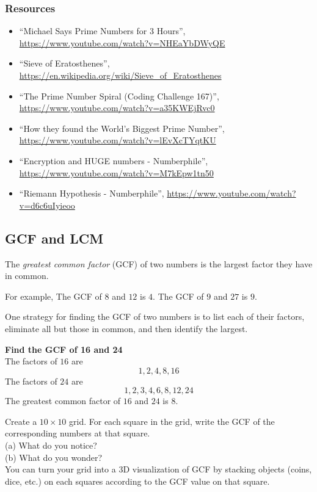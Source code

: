 \subsubsection{Resources}
\begin{itemize}
	\item {\footnotesize ``Michael Says Prime Numbers for 3 Hours'', \url{https://www.youtube.com/watch?v=NHEaYbDWyQE}}
	\item {\footnotesize ``Sieve of Eratosthenes'', \url{https://en.wikipedia.org/wiki/Sieve_of_Eratosthenes}}
	\item {\footnotesize ``The Prime Number Spiral (Coding Challenge 167)'', \url{https://www.youtube.com/watch?v=a35KWEjRvc0}}
	\item {\footnotesize ``How they found the World's Biggest Prime Number'', \url{https://www.youtube.com/watch?v=lEvXcTYqtKU}}
	\item {\footnotesize ``Encryption and HUGE numbers - Numberphile'', \url{https://www.youtube.com/watch?v=M7kEpw1tn50}}
	\item {\footnotesize ``Riemann Hypothesis - Numberphile'', \url{https://www.youtube.com/watch?v=d6c6uIyieoo}}
\end{itemize}

\newpage 
\subsection{GCF and LCM}

\begin{definition} 
The \emph{greatest common factor} (GCF) of two numbers is the largest factor they have in common.  

For example, The GCF of \(8\) and \(12\) is \(4\). The GCF of \(9\) and \(27\) is \(9\).  
\end{definition}
One strategy for finding the GCF of two numbers is to list each of their factors, eliminate all but those in common, and then identify the largest.  
\begin{example}\textbf{Find the GCF of 16 and 24}
\\ 
The factors of \(16\) are 
\[1,2, 4, 8, 16\]
The factors of \(24\) are 
\[ 1, 2, 3, 4, 6, 8, 12, 24 \]
The greatest common factor of \(16\) and \(24\) is \(8\). 
\end{example}
\begin{exercise}
Create a \(10 \times 10\) grid.  For each square in the grid, write the GCF of the corresponding numbers at that square.  
	\\ \hspace*{15mm}(a) What do you notice?
	\\ \hspace*{15mm}(b) What do you wonder? 
\\
You can turn your grid into a 3D visualization of GCF by stacking objects (coins, dice, etc.) on each squares according to the GCF value on that square. 
\label{ex:gcdgrid}
\end{exercise}

